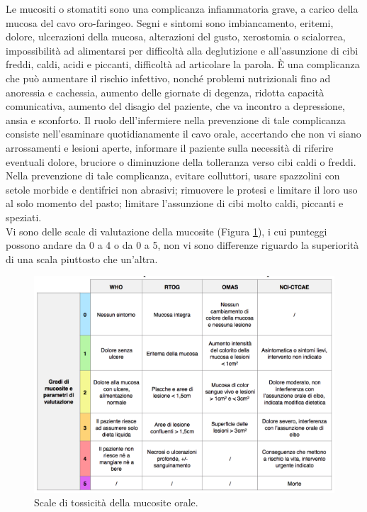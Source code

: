 Le mucositi o stomatiti sono una complicanza infiammatoria grave, a carico della mucosa del cavo oro-faringeo. 
Segni e sintomi sono imbiancamento, eritemi, dolore, ulcerazioni della mucosa, alterazioni del gusto, xerostomia o 
scialorrea, impossibilità ad alimentarsi per difficoltà alla deglutizione e all’assunzione di cibi freddi, caldi, 
acidi e piccanti, difficoltà ad articolare la parola. È una complicanza che può aumentare il rischio infettivo, 
nonché problemi nutrizionali fino ad anoressia e cachessia, aumento delle giornate di degenza, ridotta capacità 
comunicativa, aumento del disagio del paziente, che va incontro a depressione, ansia e sconforto\cite{mucositi}. 
Il ruolo dell’infermiere nella prevenzione di tale complicanza consiste nell’esaminare quotidianamente il cavo orale, 
accertando che non vi siano arrossamenti e lesioni aperte, informare il paziente sulla necessità di riferire 
eventuali dolore, bruciore o diminuzione della tolleranza verso cibi caldi o freddi. Nella prevenzione di tale 
complicanza, evitare colluttori, usare spazzolini con setole morbide e dentifrici non abrasivi; rimuovere le 
protesi e limitare il loro uso al solo momento del pasto; limitare l'assunzione di cibi molto caldi, 
piccanti e speziati\cite{mucositi}.\\ 
Vi sono delle scale di valutazione della mucosite (Figura \ref{fig:FIGURE_4.2}), i cui punteggi possono andare da 0 a 4 o 
da 0 a 5, non vi sono differenze riguardo la superiorità di una scala piuttosto che un’altra\cite{SCALEmucositi}.\\

\begin{figure}[H]
    \begin{center}
    \includegraphics[width=0.7\columnwidth]{img/SCALEMUCOSITI.png}
    \end{center}
    \caption{Scale di tossicità della mucosite orale.
    \cite{img39BIS}}
    \label{fig:FIGURE_4.2}
\end{figure}

